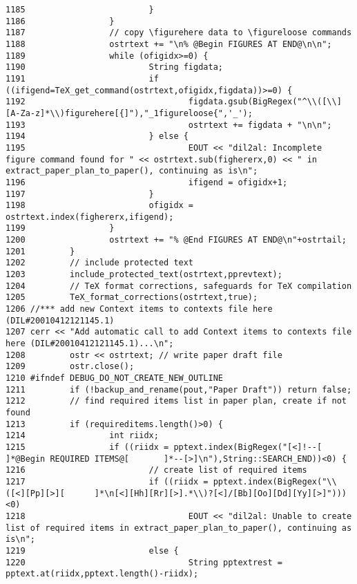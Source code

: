 \begin{verbatim}
1185                         }
1186                 }
1187                 // copy \figurehere data to \figureloose commands
1188                 ostrtext += "\n% @Begin FIGURES AT END@\n\n";
1189                 while (ofigidx>=0) {
1190                         String figdata;
1191                         if ((ifigend=TeX_get_command(ostrtext,ofigidx,figdata))>=0) {
1192                                 figdata.gsub(BigRegex("^\\([\\][A-Za-z]*\\)figurehere[{]"),"_1figureloose{",'_');
1193                                 ostrtext += figdata + "\n\n";
1194                         } else {
1195                                 EOUT << "dil2al: Incomplete figure command found for " << ostrtext.sub(fighererx,0) << " in extract_paper_plan_to_paper(), continuing as is\n";
1196                                 ifigend = ofigidx+1;
1197                         }
1198                         ofigidx = ostrtext.index(fighererx,ifigend);
1199                 }
1200                 ostrtext += "% @End FIGURES AT END@\n"+ostrtail;
1201         }
1202         // include protected text
1203         include_protected_text(ostrtext,pprevtext);
1204         // TeX format corrections, safeguards for TeX compilation
1205         TeX_format_corrections(ostrtext,true);
1206 //*** add new Context items to contexts file here (DIL#20010412121145.1)
1207 cerr << "Add automatic call to add Context items to contexts file here (DIL#20010412121145.1)...\n";
1208         ostr << ostrtext; // write paper draft file
1209         ostr.close();
1210 #ifndef DEBUG_DO_NOT_CREATE_NEW_OUTLINE
1211         if (!backup_and_rename(pout,"Paper Draft")) return false;
1212         // find required items list in paper plan, create if not found
1213         if (requireditems.length()>0) {
1214                 int riidx;
1215                 if ((riidx = pptext.index(BigRegex("[<]!--[     ]*@Begin REQUIRED ITEMS@[       ]*--[>]\n"),String::SEARCH_END))<0) {
1216                         // create list of required items
1217                         if ((riidx = pptext.index(BigRegex("\\([<][Pp][>][      ]*\n[<][Hh][Rr][>].*\\)?[<]/[Bb][Oo][Dd][Yy][>]")))<0)
1218                                 EOUT << "dil2al: Unable to create list of required items in extract_paper_plan_to_paper(), continuing as is\n";
1219                         else {
1220                                 String pptextrest = pptext.at(riidx,pptext.length()-riidx);

\end{verbatim}

